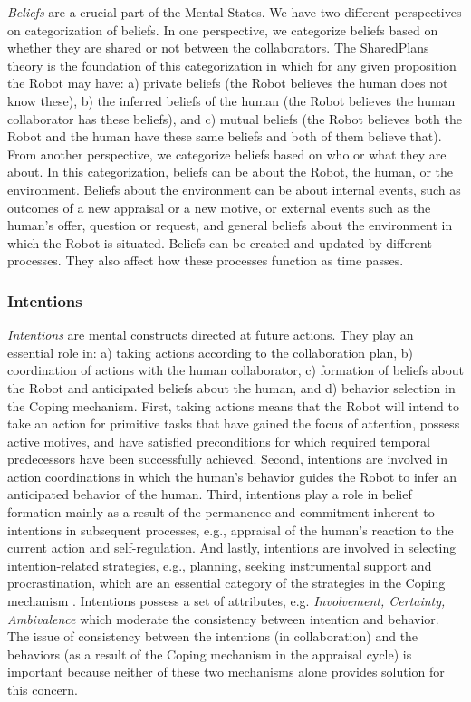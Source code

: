 \textit{Beliefs} are a crucial part of the Mental States. We have two different
perspectives on categorization of beliefs. In one perspective, we categorize
beliefs based on whether they are shared or not between the collaborators. The
SharedPlans \cite{grosz:plans-discourse} theory is the foundation of this
categorization in which for any given proposition the Robot may have: a) private
beliefs (the Robot believes the human does not know these), b) the inferred
beliefs of the human (the Robot believes the human collaborator has these
beliefs), and c) mutual beliefs (the Robot believes both the Robot and the human
have these same beliefs and both of them believe that). From another
perspective, we categorize beliefs based on who or what they are about. In this
categorization, beliefs can be about the Robot, the human, or the environment.
Beliefs about the environment can be about internal events, such as outcomes of
a new appraisal or a new motive, or external events such as the human's offer,
question or request, and general beliefs about the environment in which the
Robot is situated. Beliefs can be created and updated by different processes.
They also affect how these processes function as time passes.

\subsubsection{Intentions}
\label{sec:intentions}

\textit{Intentions} are mental constructs directed at future actions. They play
an essential role in: a) taking actions according to the collaboration plan, b)
coordination of actions with the human collaborator, c) formation of beliefs
about the Robot and anticipated beliefs about the human, and d) behavior
selection in the Coping mechanism. First, taking actions means that the Robot
will intend to take an action for primitive tasks that have gained the focus of
attention, possess active motives, and have satisfied preconditions for which
required temporal predecessors have been successfully achieved. Second,
intentions are involved in action coordinations in which the human's behavior
guides the Robot to infer an anticipated behavior of the human. Third,
intentions play a role in belief formation mainly as a result of the permanence
and commitment inherent to intentions in subsequent processes, e.g., appraisal
of the human's reaction to the current action and self-regulation. And lastly,
intentions are involved in selecting intention-related strategies, e.g.,
planning, seeking instrumental support and procrastination, which are an
essential category of the strategies in the Coping mechanism
\cite{marsella:ema-process-model}. Intentions possess a set of attributes, e.g.
\textit{Involvement, Certainty, Ambivalence} which moderate the consistency
between intention and behavior. The issue of consistency between the intentions
(in collaboration) and the behaviors (as a result of the Coping mechanism in the
appraisal cycle) is important because neither of these two mechanisms alone
provides solution for this concern.

